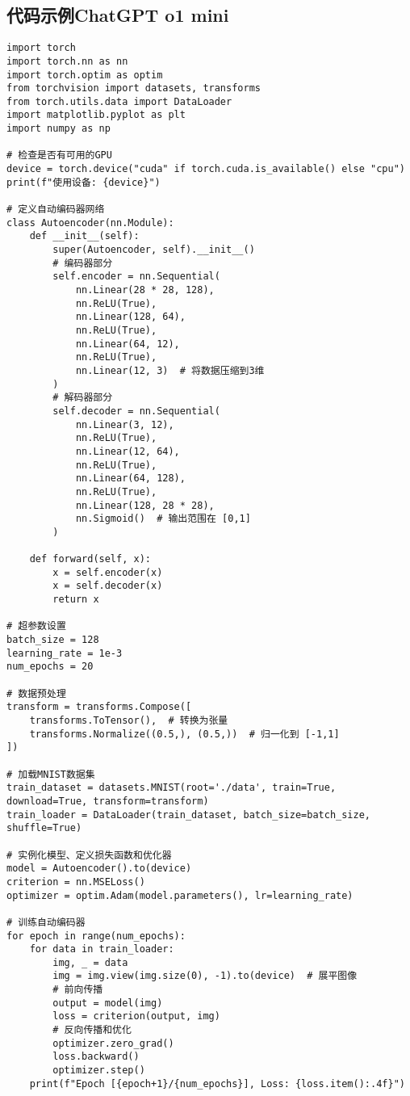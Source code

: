 \subsection*{代码示例ChatGPT o1 mini}
\begin{lstlisting}
import torch
import torch.nn as nn
import torch.optim as optim
from torchvision import datasets, transforms
from torch.utils.data import DataLoader
import matplotlib.pyplot as plt
import numpy as np

# 检查是否有可用的GPU
device = torch.device("cuda" if torch.cuda.is_available() else "cpu")
print(f"使用设备: {device}")

# 定义自动编码器网络
class Autoencoder(nn.Module):
    def __init__(self):
        super(Autoencoder, self).__init__()
        # 编码器部分
        self.encoder = nn.Sequential(
            nn.Linear(28 * 28, 128),
            nn.ReLU(True),
            nn.Linear(128, 64),
            nn.ReLU(True),
            nn.Linear(64, 12),
            nn.ReLU(True),
            nn.Linear(12, 3)  # 将数据压缩到3维
        )
        # 解码器部分
        self.decoder = nn.Sequential(
            nn.Linear(3, 12),
            nn.ReLU(True),
            nn.Linear(12, 64),
            nn.ReLU(True),
            nn.Linear(64, 128),
            nn.ReLU(True),
            nn.Linear(128, 28 * 28),
            nn.Sigmoid()  # 输出范围在 [0,1]
        )

    def forward(self, x):
        x = self.encoder(x)
        x = self.decoder(x)
        return x

# 超参数设置
batch_size = 128
learning_rate = 1e-3
num_epochs = 20

# 数据预处理
transform = transforms.Compose([
    transforms.ToTensor(),  # 转换为张量
    transforms.Normalize((0.5,), (0.5,))  # 归一化到 [-1,1]
])

# 加载MNIST数据集
train_dataset = datasets.MNIST(root='./data', train=True, download=True, transform=transform)
train_loader = DataLoader(train_dataset, batch_size=batch_size, shuffle=True)

# 实例化模型、定义损失函数和优化器
model = Autoencoder().to(device)
criterion = nn.MSELoss()
optimizer = optim.Adam(model.parameters(), lr=learning_rate)

# 训练自动编码器
for epoch in range(num_epochs):
    for data in train_loader:
        img, _ = data
        img = img.view(img.size(0), -1).to(device)  # 展平图像
        # 前向传播
        output = model(img)
        loss = criterion(output, img)
        # 反向传播和优化
        optimizer.zero_grad()
        loss.backward()
        optimizer.step()
    print(f"Epoch [{epoch+1}/{num_epochs}], Loss: {loss.item():.4f}")


\end{lstlisting}
